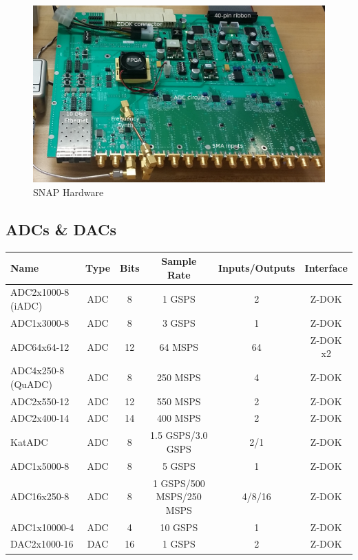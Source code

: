 \documentclass{ws-jai}
\begin{document}
\begin{figure}[h]
\centering
\includegraphics[width=150mm, scale=0.5]{snap_hw}
\caption{SNAP Hardware}
\label{fig:snap_hw}
\end{figure}

\subsection{ADCs \& DACs}

\begin{tabular}{lccccc}
Name & Type & Bits & Sample Rate & Inputs/Outputs & Interface \\
\hline
ADC2x1000-8 (iADC) & ADC & 8 & 1 GSPS & 2 & Z-DOK \\
ADC1x3000-8 & ADC & 8 & 3 GSPS & 1 & Z-DOK \\
ADC64x64-12 & ADC & 12 & 64 MSPS & 64 & Z-DOK x2 \\
ADC4x250-8 (QuADC) & ADC & 8 & 250 MSPS & 4 & Z-DOK \\
ADC2x550-12 & ADC & 12 & 550 MSPS & 2 & Z-DOK \\
ADC2x400-14 & ADC & 14 & 400 MSPS & 2 & Z-DOK \\
KatADC & ADC & 8 & 1.5 GSPS/3.0 GSPS & 2/1 & Z-DOK \\
ADC1x5000-8 & ADC & 8 & 5 GSPS & 1 & Z-DOK \\
ADC16x250-8 & ADC & 8 & 1 GSPS/500 MSPS/250 MSPS & 4/8/16 & Z-DOK \\
ADC1x10000-4 & ADC & 4 & 10 GSPS & 1 & Z-DOK \\
DAC2x1000-16 & DAC & 16 & 1 GSPS & 2 & Z-DOK \\
\end{tabular}
\end{document}
